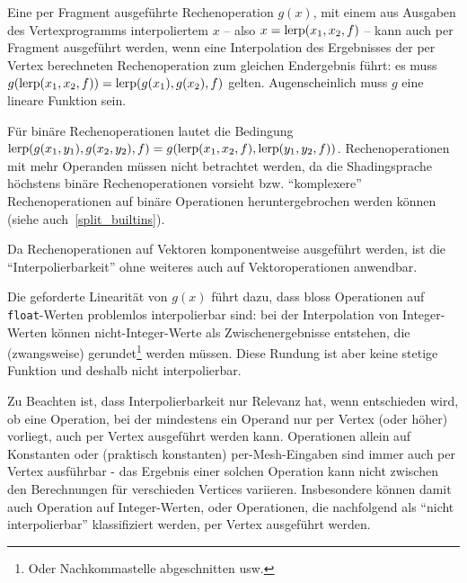 \documentclass[twoside,a4paper,fleqn,12pt]{article}
\begin{document}
Eine per Fragment ausgeführte Rechenoperation $g(x)$, mit einem aus Ausgaben des Vertexprogramms interpoliertem $x$ -- also $x = \mathrm{lerp}(x_1, x_2, f)$ --
kann auch per Fragment ausgeführt werden, wenn eine Interpolation des Ergebnisses der per Vertex berechneten Rechenoperation zum gleichen Endergebnis führt:
es muss $g(\mathrm{lerp}(x_1, x_2, f)) = \mathrm{lerp} (g(x_1), g(x_2), f)$ gelten. Augenscheinlich muss $g$ eine lineare Funktion sein.

Für binäre Rechenoperationen lautet die Bedingung $\mathrm{lerp} (g (x_1, y_1), g (x_2, y_2), f) = g (\mathrm{lerp} (x_1, x_2, f), \mathrm{lerp} (y_1, y_2, f))$.
Rechenoperationen mit mehr Operanden müssen nicht betrachtet werden, da die Shadingsprache höchstens
binäre Rechenoperationen vorsieht bzw. "`komplexere"' Rechenoperationen auf binäre Operationen heruntergebrochen werden
können (siehe auch~\ref{split_builtins}). %

Da Rechenoperationen auf Vektoren komponentweise ausgeführt werden,  ist die "`Interpolierbarkeit"' ohne weiteres auch auf Vektoroperationen anwendbar.

Die geforderte Linearität von $g(x)$ führt dazu, dass bloss Operationen auf \texttt{float}-Werten problemlos interpolierbar sind:
bei der Interpolation von Integer-Werten können nicht-Integer-Werte als Zwischenergebnisse entstehen,
die (zwangsweise) gerundet\footnote{Oder Nachkommastelle abgeschnitten usw.} werden müssen. Diese Rundung
ist aber keine stetige Funktion und deshalb nicht interpolierbar.

Zu Beachten ist, dass Interpolierbarkeit nur Relevanz hat, wenn entschieden wird, ob eine Operation, bei der mindestens ein Operand
nur per Vertex (oder höher) vorliegt, auch per Vertex ausgeführt werden kann.
Operationen allein auf Konstanten oder (praktisch konstanten) per-Mesh-Eingaben sind immer auch per Vertex ausführbar - das Ergebnis
einer solchen Operation kann nicht zwischen den Berechnungen für verschieden Vertices variieren. Insbesondere können damit
auch Operation auf Integer-Werten, oder Operationen, die nachfolgend als "`nicht interpolierbar"' klassifiziert werden,
per Vertex ausgeführt werden.


\end{document}
